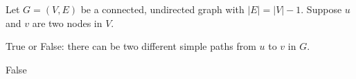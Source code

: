 \begin{prob}

    Let $G = (V, E)$ be a connected, undirected graph with $|E| = |V| - 1$.
    Suppose $u$ and $v$ are two nodes in $V$.

    True or False: there can be two different simple paths from $u$ to $v$ in $G$.

    \tF{}

    \begin{soln}
        False
    \end{soln}

\end{prob}
